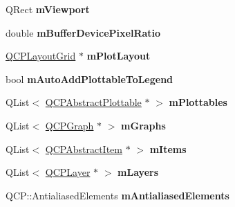\begin{DoxyCompactItemize}
\item 
Q\+Rect {\bfseries m\+Viewport}\hypertarget{classQCustomPlot_ac0a7c38a715526c257cff95774f83ab6}{}\label{classQCustomPlot_ac0a7c38a715526c257cff95774f83ab6}

\item 
double {\bfseries m\+Buffer\+Device\+Pixel\+Ratio}\hypertarget{classQCustomPlot_a63a40c57a2d89eea27b90b62cc4eee1f}{}\label{classQCustomPlot_a63a40c57a2d89eea27b90b62cc4eee1f}

\item 
\hyperlink{classQCPLayoutGrid}{Q\+C\+P\+Layout\+Grid} $\ast$ {\bfseries m\+Plot\+Layout}\hypertarget{classQCustomPlot_ac97298756882a0eecd98151679850ac1}{}\label{classQCustomPlot_ac97298756882a0eecd98151679850ac1}

\item 
bool {\bfseries m\+Auto\+Add\+Plottable\+To\+Legend}\hypertarget{classQCustomPlot_aaf3ea6a4cb04d35a149cc9a0cdac3394}{}\label{classQCustomPlot_aaf3ea6a4cb04d35a149cc9a0cdac3394}

\item 
Q\+List$<$ \hyperlink{classQCPAbstractPlottable}{Q\+C\+P\+Abstract\+Plottable} $\ast$ $>$ {\bfseries m\+Plottables}\hypertarget{classQCustomPlot_a62bf8e4e7f8d23fc1e9301ba0148269f}{}\label{classQCustomPlot_a62bf8e4e7f8d23fc1e9301ba0148269f}

\item 
Q\+List$<$ \hyperlink{classQCPGraph}{Q\+C\+P\+Graph} $\ast$ $>$ {\bfseries m\+Graphs}\hypertarget{classQCustomPlot_adaf8d407d72a725169d7dbed2ee386bb}{}\label{classQCustomPlot_adaf8d407d72a725169d7dbed2ee386bb}

\item 
Q\+List$<$ \hyperlink{classQCPAbstractItem}{Q\+C\+P\+Abstract\+Item} $\ast$ $>$ {\bfseries m\+Items}\hypertarget{classQCustomPlot_a6a93905372326e31e98d6c3bc8953ec8}{}\label{classQCustomPlot_a6a93905372326e31e98d6c3bc8953ec8}

\item 
Q\+List$<$ \hyperlink{classQCPLayer}{Q\+C\+P\+Layer} $\ast$ $>$ {\bfseries m\+Layers}\hypertarget{classQCustomPlot_a72ee313041b873d76c198793ce7e6c37}{}\label{classQCustomPlot_a72ee313041b873d76c198793ce7e6c37}

\item 
Q\+C\+P\+::\+Antialiased\+Elements {\bfseries m\+Antialiased\+Elements}\hypertarget{classQCustomPlot_aa333200629256830e273873b582a5524}{}\label{classQCustomPlot_aa333200629256830e273873b582a5524}


\end{DoxyCompactItemize}
